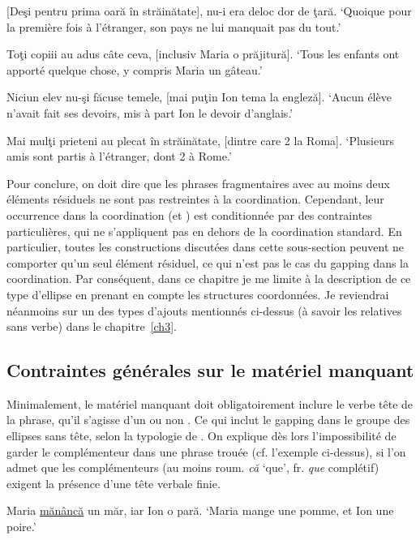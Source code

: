 \ex {} [Deşi pentru prima oară în străinătate], nu-i era deloc dor de ţară. \label{ch2:ex71b}
\glt ‘Quoique pour la première fois à l’étranger, son pays ne lui manquait pas du tout.’

\ex Toţi copiii au adus câte ceva, [inclusiv Maria o prăjitură]. \label{ch2:ex71c}
\glt ‘Tous les enfants ont apporté quelque chose, y compris Maria un gâteau.’

\ex Niciun elev nu-şi făcuse temele, [mai puţin Ion tema la engleză]. \label{ch2:ex71d}
\glt ‘Aucun élève n’avait fait ses devoirs, mis à part Ion le devoir d’anglais.’  

\ex Mai mulţi prieteni au plecat în străinătate, [dintre care 2 la Roma]. \label{ch2:ex71e}
\glt ‘Plusieurs amis sont partis à l’étranger, dont 2 à Rome.’
\z
\z

Pour conclure, on doit dire que les phrases fragmentaires avec au moins deux éléments résiduels ne sont pas restreintes à la coordination. Cependant, leur occurrence dans la coordination (et ) est conditionnée par des con\-traintes particulières, qui ne s’appliquent pas en dehors de la coordination standard. En particulier, toutes les constructions discutées dans cette sous-section peuvent ne comporter qu’un seul élément résiduel, ce qui n’est pas le cas du gapping dans la coordination. Par conséquent, dans ce chapitre je me limite à la description de ce type d’ellipse en prenant en compte les structures coordonnées. Je reviendrai néanmoins sur un des types d’ajouts mentionnés ci-dessus (à savoir les relatives sans verbe) dans le chapitre~\ref{ch3}. 


\subsection{Contraintes générales sur le matériel manquant} \label{ch2:sect2.3.2}


Minimalement, le matériel manquant doit obligatoirement inclure le verbe tête de la phrase, qu’il s’agisse d’un  ou non . Ce qui inclut le gapping dans le groupe des ellipses sans tête, selon la typologie de \citet{Chao1988}. On explique dès lors l’impossibilité de garder le complémenteur dans une phrase trouée (cf. l’exemple  ci-dessus), si l’on admet que les complémenteurs (au moins roum. \textit{că} ‘que’, fr. \textit{que} complétif) exigent la présence d’une tête verbale finie.

\ea \label{ch2:ex72}
\ea Maria \uline{mănâncă} un măr, iar Ion o pară.
\glt ‘Maria mange une pomme, et Ion une poire.’  

